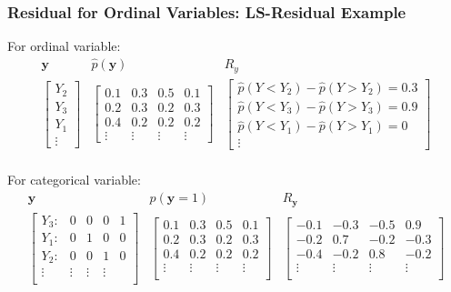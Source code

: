\documentclass{beamer}
\begin{document}
\begin{frame}
	\frametitle{Residual for Ordinal Variables: LS-Residual Example}
	For ordinal variable:
	\[
		\begin{array}{ccc}
			\bm{y} & \hat{p}(\bm{y}) & R_{y} \\

			\begin{bmatrix}
				Y_2 \\
				Y_3 \\
				Y_1 \\
				\vdots
			\end{bmatrix} &
			\begin{bmatrix}
				0.1 & 0.3 & 0.5 & 0.1 \\
				0.2 & 0.3 & 0.2 & 0.3 \\
				0.4 & 0.2 & 0.2 & 0.2 \\
				\vdots & \vdots & \vdots & \vdots
			\end{bmatrix} &
			\begin{bmatrix}
				\hat{p}(Y < Y_2) - \hat{p}(Y>Y_2) = 0.3 \\
				\hat{p}(Y < Y_3) - \hat{p}(Y>Y_3) = 0.9 \\
				\hat{p}(Y < Y_1) - \hat{p}(Y>Y_1) = 0 \\
				\vdots
			\end{bmatrix} \\
		\end{array}
	\]

	For categorical variable:
	\[
		\begin{array}{ccc}
			\bm{y} & \hat{p}(\bm{y}=1) & R_{\bm{y}} \\
			\begin{bmatrix}
				Y_3: & 0 & 0 & 0 & 1 \\
				Y_1: & 0 & 1 & 0 & 0 \\
				Y_2: & 0 & 0 & 1 & 0 \\
				\vdots & \vdots & \vdots & \vdots \\
			\end{bmatrix} & 
			\begin{bmatrix}
				0.1 & 0.3 & 0.5 & 0.1 \\
				0.2 & 0.3 & 0.2 & 0.3 \\
				0.4 & 0.2 & 0.2 & 0.2 \\
				\vdots & \vdots & \vdots & \vdots \\
			\end{bmatrix} & 
			\begin{bmatrix}
				-0.1 & -0.3 & -0.5 & 0.9 \\
				-0.2 & 0.7 & -0.2& -0.3 \\
				-0.4 & -0.2 & 0.8 & -0.2 \\
				\vdots & \vdots & \vdots & \vdots \\
			\end{bmatrix} \\
		\end{array}
	\]
\end{frame}
\end{document}
